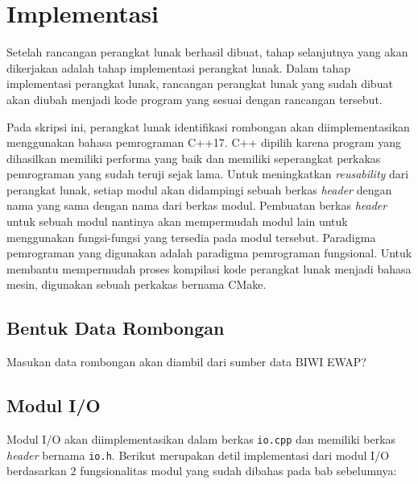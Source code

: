 \chapter{Implementasi}
\label{chap:implementasi}

Setelah rancangan perangkat lunak berhasil dibuat, tahap selanjutnya yang akan dikerjakan adalah tahap implementasi perangkat lunak. Dalam tahap implementasi perangkat lunak, rancangan perangkat lunak yang sudah dibuat akan diubah menjadi kode program yang sesuai dengan rancangan tersebut.

Pada skripsi ini, perangkat lunak identifikasi rombongan akan diimplementasikan menggunakan bahasa pemrograman C++17. C++ dipilih karena program yang dihasilkan memiliki performa yang baik dan memiliki seperangkat perkakas pemrograman yang sudah teruji sejak lama. Untuk meningkatkan \textit{reusability} dari perangkat lunak, setiap modul akan didampingi sebuah berkas \textit{header} dengan nama yang sama dengan nama dari berkas modul. Pembuatan berkas \textit{header} untuk sebuah modul nantinya akan mempermudah modul lain untuk menggunakan fungsi-fungsi yang tersedia pada modul tersebut. Paradigma pemrograman yang digunakan adalah paradigma pemrograman fungsional. Untuk membantu mempermudah proses kompilasi kode perangkat lunak menjadi bahasa mesin, digunakan sebuah perkakas bernama CMake.

\section{Bentuk Data Rombongan}
\label{sec:input-structure}

Masukan data rombongan akan diambil dari sumber data BIWI EWAP?

\section{Modul I/O}
\label{sec:impl-io}

Modul I/O akan diimplementasikan dalam berkas \texttt{io.cpp} dan memiliki berkas \textit{header} bernama \texttt{io.h}. Berikut merupakan detil implementasi dari modul I/O berdasarkan 2 fungsionalitas modul yang sudah dibahas pada bab sebelumnya:

